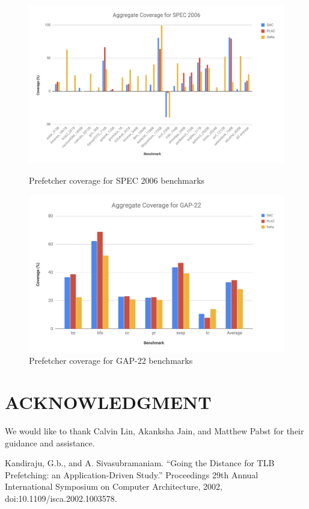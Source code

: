 \documentclass[conference]{IEEEtran}
\begin{document}
    \begin{figure}[h] %
        \centering
            \includegraphics[width=.95\textwidth]{aggregate_coverage.png}
        \caption{Prefetcher coverage for SPEC 2006 benchmarks}
        \vspace*{\floatsep}
        \vspace*{\floatsep}
        \centering
            \includegraphics[width=.95\textwidth]{aggregate_coverage_gap22.png}
        \caption{Prefetcher coverage for GAP-22 benchmarks}
    \end{figure}

\section*{ACKNOWLEDGMENT}

    We would like to thank Calvin Lin, Akanksha Jain, and Matthew Pabst for their guidance and assistance.

\begin{thebibliography}{99}
     Kandiraju, G.b., and A. Sivasubramaniam. “Going the Distance for TLB Prefetching: an Application-Driven Study.” Proceedings 29th Annual International Symposium on Computer Architecture, 2002, doi:10.1109/isca.2002.1003578.
\end{thebibliography}
\end{document}
